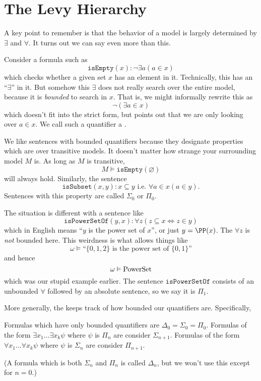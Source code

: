 \section{The Levy Hierarchy}
A key point to remember is that the behavior of a model is largely determined by $\exists$ and $\forall$.
It turns out we can say even more than this.

Consider a formula such as
\[ \mathtt{isEmpty}(x) : \neg \exists a (a \in x) \]
which checks whether a given set $x$ has an element in it.
Technically, this has an ``$\exists$'' in it.
But somehow this $\exists$ does not really search over the entire model,
because it is \emph{bounded} to search in $x$.
That is, we might informally rewrite this as
\[ \neg (\exists a \in x) \]
which doesn't fit into the strict form,
but points out that we are only looking over $a \in x$.
We call such a quantifier a .

We like sentences with bounded quantifiers because they designate
properties which are  over transitive models.
It doesn't matter how strange your surrounding model $M$ is.
As long as $M$ is transitive, 
\[ M \vDash \mathtt{isEmpty}(\varnothing) \]
will always hold.
Similarly, the sentence
\[ \mathtt{isSubset}(x,y) : x \subseteq y \text { i.e. } \forall a \in x (a \in y). \]
Sentences with this property are called $\Sigma_0$ or $\Pi_0$.

The situation is different with a sentence like
\[
	\mathtt{isPowerSetOf}(y,x) :
	\forall z \left( z \subseteq x \iff z \in y  \right)
\]
which in English means ``$y$ is the power set of $x$'', or just $y = \PP(x)$.
The $\forall z$ is \emph{not} bounded here.
This weirdness is what allows things like
\[ \omega \vDash \text{``$\{0,1,2\}$ is the power set of $\{0,1\}$''} \]
and hence
\[ \omega \vDash \mathrm{PowerSet} \]
which was our stupid example earlier.
The sentence $\mathtt{isPowerSetOf}$ consists of an unbounded $\forall$ followed
by an absolute sentence, so we say it is $\Pi_1$.

More generally, the  keeps track of how bounded our
quantifiers are.
Specifically,
\begin{itemize}
	\ii Formulas which have only bounded quantifiers are $\Delta_0 = \Sigma_0 = \Pi_0$.
	\ii Formulas of the form $\exists x_1 \dots \exists x_k \psi$ where $\psi$ is $\Pi_n$
	are consider $\Sigma_{n+1}$.
	\ii Formulas of the form $\forall x_1 \dots \forall x_k \psi$ where $\psi$ is $\Sigma_n$
	are consider $\Pi_{n+1}$.
\end{itemize}
(A formula which is both $\Sigma_n$ and $\Pi_n$ is called $\Delta_n$, but we won't
use this except for $n=0$.)

